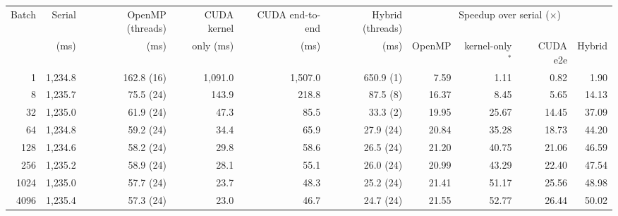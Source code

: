 \begin{tabular}{rrrrrrrrrr}
\toprule
Batch & Serial & OpenMP (threads) & CUDA kernel & CUDA end-to-end & Hybrid (threads) & \multicolumn{4}{c}{Speedup over serial ($\times$)} \\
\cmidrule(lr){7-10}
 & (ms) & (ms) & only (ms) & (ms) & (ms) & OpenMP & kernel-only$^{\ast}$ & CUDA e2e & Hybrid \\
\midrule
1 & 1{,}234.8 & 162.8 (16) & 1{,}091.0 & 1{,}507.0 & 650.9 (1) & 7.59 & 1.11 & 0.82 & 1.90 \\
8 & 1{,}235.7 & 75.5 (24) & 143.9 & 218.8 & 87.5 (8) & 16.37 & 8.45 & 5.65 & 14.13 \\
32 & 1{,}235.0 & 61.9 (24) & 47.3 & 85.5 & 33.3 (2) & 19.95 & 25.67 & 14.45 & 37.09 \\
64 & 1{,}234.8 & 59.2 (24) & 34.4 & 65.9 & 27.9 (24) & 20.84 & 35.28 & 18.73 & 44.20 \\
128 & 1{,}234.6 & 58.2 (24) & 29.8 & 58.6 & 26.5 (24) & 21.20 & 40.75 & 21.06 & 46.59 \\
256 & 1{,}235.2 & 58.9 (24) & 28.1 & 55.1 & 26.0 (24) & 20.99 & 43.29 & 22.40 & 47.54 \\
1024 & 1{,}235.0 & 57.7 (24) & 23.7 & 48.3 & 25.2 (24) & 21.41 & 51.17 & 25.56 & 48.98 \\
4096 & 1{,}235.4 & 57.3 (24) & 23.0 & 46.7 & 24.7 (24) & 21.55 & 52.77 & 26.44 & 50.02 \\
\bottomrule
\end{tabular}
